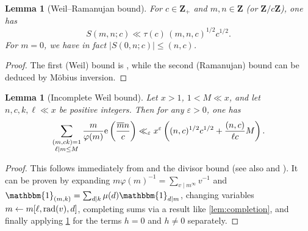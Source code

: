 \documentclass[reqno,11pt]{amsart}
\newtheorem{lemma}[theorem]{Lemma}
\theoremstyle{definition}
\theoremstyle{remark}
\numberwithin{equation}{section}
\newcommand{\Z}{\mathbf{Z}}
\newcommand{\e}{\textnormal{e}}
\newcommand{\one}{\mathbbm{1}}
\newcommand{\eps}{\varepsilon}
\renewcommand{\bar}{\overline}
\newcommand{\rad}{\textnormal{rad}}
\begin{document}
\begin{lemma}[Weil--Ramanujan bound] \label{lem:weil}
For $c \in \Z_+$ and $m, n \in \Z$ (or $\Z/c\Z$), one has
\[
    S(m, n; c) \ll \tau(c)\, (m, n, c)^{1/2} c^{1/2}.
\]
For $m = 0$, we have in fact $|S(0, n; c)| \le (n, c)$.
\end{lemma}

\begin{proof}
The first (Weil) bound is \cite[Corollary 11.12]{iwaniec2021analytic}, while the second (Ramanujan) bound can be deduced by M\"obius inversion.
\end{proof}

\begin{lemma}[Incomplete Weil bound] \label{lem:incomplete-weil}
Let $x > 1$, $1 < M \ll x$, and let $n, c, k, \ell \ll x$ be positive integers. Then for any $\eps > 0$, one has
\[
    \sum_{\substack{(m, ck) = 1 \\ \ell \mid m \le M}} 
    \frac{m}{\varphi(m)} \e\left(\frac{\bar{m}n}{c}\right)
    \ll_{\eps}
    x^\eps \left((n, c)^{1/2} c^{1/2} + \frac{(n, c)}{\ell c} M \right).
\]
\end{lemma}
\begin{proof}
This follows immediately from \cite[(2.5)]{drappeau2015theoremes} and the divisor bound (see also \cite[Lemme 4]{fouvry1982repartition} and \cite[Lemma 16.1]{maynard2020primes}). It can be proven by expanding $m\varphi(m)^{-1} = \sum_{v \mid m^\infty} v^{-1}$ and $\one_{(m, k)} = \sum_{d \mid k} \mu(d) \one_{d \mid m}$, changing variables $m \gets m [\ell, \rad(v), d]$, completing sums via a result like \cref{lem:completion}, and finally applying \cref{lem:weil} for the terms $h = 0$ and $h \neq 0$ separately.
\end{proof}
\end{document}
